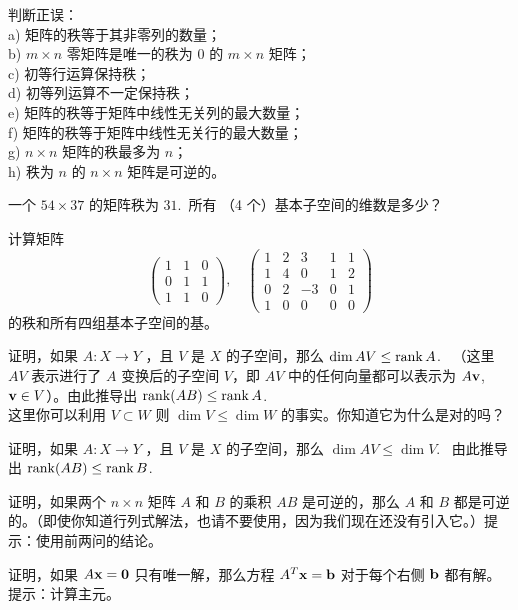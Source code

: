 \begin{problemset}
\item \label{ex:02-07-01} 判断正误：
\\
a) 矩阵的秩等于其非零列的数量；
\\
b) $m \times n$ 零矩阵是唯一的秩为 0 的 $m \times n$ 矩阵；
\\
c) 初等行运算保持秩；
\\
d) 初等列运算不一定保持秩；
\\
e) 矩阵的秩等于矩阵中线性无关列的最大数量；
\\
f) 矩阵的秩等于矩阵中线性无关行的最大数量；
\\
g) $n \times n$ 矩阵的秩最多为 $n$；
\\
h) 秩为 $n$ 的 $n \times n$ 矩阵是可逆的。
\item \label{ex:02-07-02} 一个 $54 \times 37$ 的矩阵秩为 $31$.~所有 （4 个）基本子空间的维数是多少？
\item \label{ex:02-07-03} 计算矩阵
$$\begin{pmatrix} 1 & 1 & 0 \\ 0 & 1 & 1 \\ 1 & 1 & 0 \end{pmatrix},\quad \begin{pmatrix} 1 & 2 & 3 & 1 & 1 \\ 1 & 4 & 0 & 1 & 2 \\ 0 & 2 & -3 & 0 & 1 \\ 1 & 0 & 0 & 0 & 0 \end{pmatrix}$$
的秩和所有四组基本子空间的基。
\item \label{ex:02-07-04} 证明，如果 $A: X \to Y$ ，且 $V$ 是 $X$ 的子空间，那么 $\dim AV \le \operatorname{rank} A$. ~（这里 $AV$ 表示进行了 $A$ 变换后的子空间 $V$，即 $AV$ 中的任何向量都可以表示为 $A \mathbf{v}$, $\mathbf{v} \in V$）。由此推导出 $\operatorname{rank}(AB) \le \operatorname{rank} A$. ~
\\
这里你可以利用 $V \subset W$ 则 $\dim V \le \dim W$ 的事实。你知道它为什么是对的吗？
\item \label{ex:02-07-05} 证明，如果 $A: X \to Y$ ，且 $V$ 是 $X$ 的子空间，那么 $\dim AV \le \dim V$. ~由此推导出 $\operatorname{rank}(AB) \le \operatorname{rank} B$. ~
\item \label{ex:02-07-06} 证明，如果两个 $n \times n$ 矩阵 $A$ 和 $B$ 的乘积 $AB$ 是可逆的，那么 $A$ 和 $B$ 都是可逆的。（即使你知道行列式解法，也请不要使用，因为我们现在还没有引入它。）{\heiti 提示}：使用前两问的结论。
\item \label{ex:02-07-07} 证明，如果 $A \mathbf{x} = \mathbf{0}$ 只有唯一解，那么方程 $A^T \mathbf{x} = \mathbf{b}$ 对于每个右侧 $\mathbf{b}$ 都有解。{\heiti 提示}：计算主元。

\end{problemset}

